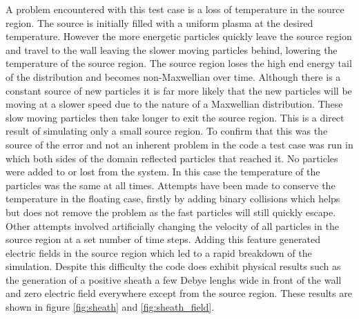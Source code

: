\documentclass[12pt]{article}
\begin{document}
A problem encountered with this test case is a loss of temperature in the source region. The source is initially filled with a uniform plasma at the desired temperature. However the more energetic particles quickly leave the source region and travel to the wall leaving the slower moving particles behind, lowering the temperature of the source region. The source region loses the high end energy tail of the distribution and becomes non-Maxwellian over time. Although there is a constant source of new particles it is far more likely that the new particles will be moving at a slower speed due to the nature of a Maxwellian distribution. These slow moving particles then take longer to exit the source region. This is a direct result of simulating only a small source region. To confirm that this was the source of the error and not an inherent problem in the code a test case was run in which both sides of the domain reflected particles that reached it. No particles were added to or lost from the system. In this case the temperature of the particles was the same at all times. Attempts have been made to conserve the temperature in the floating case, firstly by adding binary collisions which helps but does not remove the problem as the fast particles will still quickly escape. Other attempts involved artificially changing the velocity of all particles in the source region at a set number of time steps. Adding this feature generated electric fields in the source region which led to a rapid breakdown of the simulation. Despite this difficulty the code does exhibit physical results such as the generation of a positive sheath a few Debye lenghs wide in front of the wall and zero electric field everywhere except from the source region. These results are shown in figure \ref{fig:sheath} and \ref{fig:sheath_field}.
\end{document}
